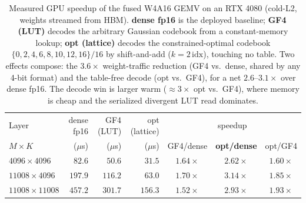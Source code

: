 \begin{table}[t]
  \centering
  \caption{Measured GPU speedup of the fused W4A16 GEMV on an RTX 4080 (cold-L2,
  weights streamed from HBM). \textbf{dense fp16} is the deployed baseline;
  \textbf{GF4 (LUT)} decodes the arbitrary Gaussian codebook from a constant-memory
  lookup; \textbf{opt (lattice)} decodes the constrained-optimal codebook
  $\{0,2,4,6,8,10,12,16\}/16$ by shift-and-add ($k=2\,\mathrm{idx}$), touching no
  table. Two effects compose: the $3.6\times$ weight-traffic reduction (GF4 vs.\
  dense, shared by any 4-bit format) and the table-free decode (opt vs.\ GF4),
  for a net $2.6$--$3.1\times$ over dense fp16. The decode win is larger warm
  ($\approx3\times$ opt vs.\ GF4), where memory is cheap and the serialized
  divergent LUT read dominates.}
  \label{tab:gpu-speedup}
  \small
  \begin{tabular}{lrrrccc}
    \toprule
    Layer & dense fp16 & GF4 (LUT) & opt (lattice) & \multicolumn{3}{c}{speedup} \\
    \cmidrule(lr){5-7}
    $M\times K$ & ($\mu$s) & ($\mu$s) & ($\mu$s) & GF4/dense & \textbf{opt/dense} & opt/GF4 \\
    \midrule
    $4096\times4096$    & $82.6$  & $50.6$  & $31.5$  & $1.64\times$ & $\mathbf{2.62\times}$ & $1.60\times$ \\
    $11008\times4096$   & $197.9$ & $116.2$ & $63.0$  & $1.70\times$ & $\mathbf{3.14\times}$ & $1.85\times$ \\
    $11008\times11008$  & $457.2$ & $301.7$ & $156.3$ & $1.52\times$ & $\mathbf{2.93\times}$ & $1.93\times$ \\
    \bottomrule
  \end{tabular}
\end{table}
